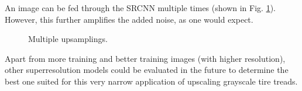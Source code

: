 \documentclass[english]{mvi-report}
\begin{document}
An image can be fed through the SRCNN multiple times (shown in Fig. \ref{fig:multi-example}). However, this further amplifies the added noise, as one would expect.

\begin{figure}[htpb]
    \centerline{
    }
    \caption{Multiple upsamplings.}
    \label{fig:multi-example}
\end{figure}

Apart from more training and better training images (with higher resolution), other superresolution models could be evaluated in the future to determine the best one suited for this very narrow application of upscaling grayscale tire treads.
\end{document}
